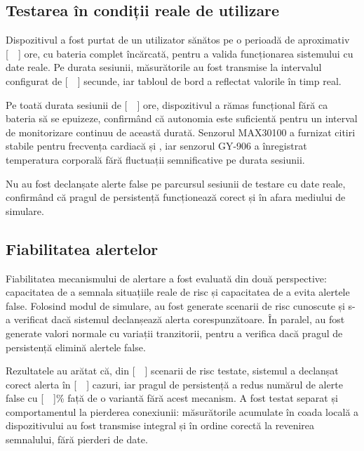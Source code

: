\subsection{Testarea în condiții reale de utilizare}

Dispozitivul a fost purtat de un utilizator sănătos pe o perioadă de aproximativ [\ \ ] ore, cu bateria complet încărcată, pentru a valida funcționarea sistemului cu date reale. Pe durata sesiunii, măsurătorile au fost transmise la intervalul configurat de [\ \ ] secunde, iar tabloul de bord a reflectat valorile în timp real.

Pe toată durata sesiunii de [\ \ ] ore, dispozitivul a rămas funcțional fără ca bateria să se epuizeze, confirmând că autonomia este suficientă pentru un interval de monitorizare continuu de această durată. Senzorul MAX30100 a furnizat citiri stabile pentru frecvența cardiacă și \spo, iar senzorul GY-906 a înregistrat temperatura corporală fără fluctuații semnificative pe durata sesiunii.

Nu au fost declanșate alerte false pe parcursul sesiunii de testare cu date reale, confirmând că pragul de persistență funcționează corect și în afara mediului de simulare.

\subsection{Fiabilitatea alertelor}

Fiabilitatea mecanismului de alertare a fost evaluată din două perspective: capacitatea de a semnala situațiile reale de risc și capacitatea de a evita alertele false. Folosind modul de simulare, au fost generate scenarii de risc cunoscute și s-a verificat dacă sistemul declanșează alerta corespunzătoare. În paralel, au fost generate valori normale cu variații tranzitorii, pentru a verifica dacă pragul de persistență elimină alertele false.

Rezultatele au arătat că, din [\ \ ] scenarii de risc testate, sistemul a declanșat corect alerta în [\ \ ] cazuri, iar pragul de persistență a redus numărul de alerte false cu [\ \ ]\% față de o variantă fără acest mecanism. A fost testat separat și comportamentul la pierderea conexiunii: măsurătorile acumulate în coada locală a dispozitivului au fost transmise integral și în ordine corectă la revenirea semnalului, fără pierderi de date.
